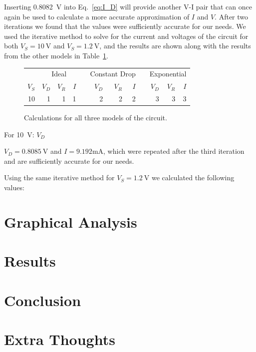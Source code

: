 \documentclass{../../ece-report}
\newcommand{\ra}[1]{\renewcommand{\arraystretch}{#1}}
\begin{document}
Inserting 0.8082~\si{\V} into Eq.~\ref{eq:I_D} will
provide another V-I pair that can once again be used
to calculate a more accurate approximation of $I$ and
$V$. After two iterations we found that the values
were sufficiently accurate for our needs. We used the iterative
method to solve for the current and voltages of the circuit for 
both $V_S = 10~\si{\V}$ and $V_S = 1.2~\si{\V}$, and the results
are shown along with the results from the other models in Table~\ref{tab:calculations}.


\begin{figure}[h!]
  \ra{1.3}
  \centering
  \begin{tabular}{rrrrcrrrcrrr}\toprule
    & \multicolumn{3}{c}{Ideal} & \phantom{abc} & \multicolumn{3}{c}{Constant Drop} & \phantom{abc} & \multicolumn{3}{c}{Exponential} \\
    $V_S$ & $V_D$ & $V_R$ & $I$ & & $V_D$ & $V_R$ & $I$ & & $V_D$ & $V_R$ & $I$ \\ \midrule
    10 & 1 & 1 & 1 & & 2 & 2 & 2 & & 3 & 3 & 3 \\
    
  \bottomrule
  \end{tabular}
  \label{tab:calculations}
  \caption{Calculations for all three models of the circuit.}
\end{figure}

For 10~\si{\V}: $V_D$

 $V_D=0.8085~\si{\V}$
and $I=9.192\si{\mA}$, which were repeated after the
third iteration and are sufficiently accurate for our
needs.

Using the same iterative method for $V_S = 1.2~\si{\V}$ we calculated
the following values:

\section{Graphical Analysis}

\section{Results}

\section{Conclusion}

\section{Extra Thoughts}
\end{document}
